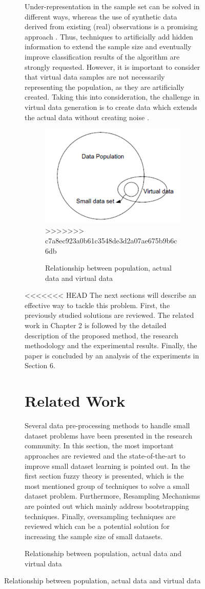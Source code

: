 \documentclass[parskip=full]{scrartcl}
\begin{document}
\begin{figure}[h]
\begin{figure}[h]
Under-representation in the sample set can be solved in different ways, whereas
the use of synthetic data derived from existing (real) observations is a
promising approach \cite{Sezer.2014}. Thus, techniques to artificially add
hidden information to extend the sample size and eventually improve
classification results of the algorithm are strongly requested. However, it is
important to consider that virtual data samples are not necessarily representing
the population, as they are artificially created. Taking this into
consideration, the challenge in virtual data generation is to create data which
extends the actual data without creating noise \cite{Li.2006}. 

\begin{figure}[h]
	\centering
	\includegraphics[width=0.35\linewidth]{./Resources/Relationship}
>>>>>>> c7a8ec923a0b61c3548de3d2a07ae675b9b6c6db
	\caption{Relationship between population, actual data and virtual data \cite{Li.2006}}
	\label{fig:relationship}
\end{figure}

<<<<<<< HEAD
The next sections will describe an effective way to tackle this problem. First, the previously studied solutions are reviewed. The related work in Chapter 2 is followed by the detailed description of the proposed method, the research methodology and the experimental results. Finally, the paper is concluded by an analysis of the experiments in Section 6.

\section{Related Work}
Several data pre-processing methods to handle small dataset problems have been presented in the research community. In this section, the most important approaches are reviewed and the state-of-the-art to improve small dataset learning is pointed out. In the first section fuzzy theory is presented, which is the most mentioned group of techniques to solve a small dataset problem. Furthermore, Resampling Mechanisms are pointed out which mainly address bootstrapping techniques. Finally, oversampling techniques are reviewed which can be a potential solution for increasing the sample size of small datasets.


\end{figure}
\end{figure}
\end{document}
